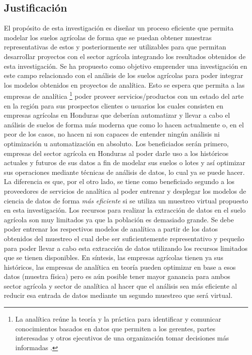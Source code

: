 %
%

\subsection{Justificación}

El propósito de esta investigación es diseñar un proceso eficiente que permita modelar los suelos agrícolas de forma que se puedan obtener muestras representativas de estos y posteriormente ser utilizables para que permitan desarrollar proyectos con el sector agrícola integrando los resultados obtenidos de esta investigación. Se ha propuesto como objetivo emprender una investigación en este campo relacionado con el análisis de los suelos agrícolas para poder integrar los modelos obtenidos en proyectos de analítica. Esto se espera que permita a las empresas de analítica \footnote{La analítica reúne la teoría y la práctica para identificar y comunicar conocimientos basados en datos que permiten a los gerentes, partes interesadas y otros ejecutivos de una organización tomar decisiones más informadas \cite{eastwood-data-analyst-2021}.} poder proveer servicios/productos con un estado del arte en la región para sus prospectos clientes o usuarios los cuales consisten en empresas agrícolas en Honduras que deberían automatizar y llevar a cabo el análisis de suelos de forma más moderna que como lo hacen actualmente o, en el peor de los casos, no hacen ni son capaces de entender ningún análisis ni optimización u automatización en absoluto. Los beneficiados serán primero, empresas del sector agrícola en Honduras al poder darle uso a los históricos actuales y futuros de sus datos a fin de modelar sus suelos o lotes y así optimizar sus operaciones mediante técnicas de análisis de datos, lo cual ya se puede hacer. La diferencia es que, por el otro lado, se tiene como beneficiado segundo a los proveedores de servicios de analítica al poder entrenar y desplegar los modelos de ciencia de datos de forma \textit{más eficiente} si se utiliza un muestreo virtual propuesto en esta investigación. Los recursos para realizar la extracción de datos en el suelo agrícola son muy limitados ya que la población es demasiado grande. Se debe poder entrenar los respectivos modelos de analítica a partir de los datos obtenidos del muestreo el cual debe ser suficientemente representativo y pequeño para poder llevar a cabo esta extracción de datos utilizando los recursos limitados que se tienen disponibles. En síntesis, las empresas agrícolas tienen ya sus históricos, las empresas de analítica en teoría pueden optimizar en base a esos datos (muestra física) pero es aún posible tener mayor ganancia para ambos sector agrícola y sector de analítica al hacer que el análisis sea más eficiente al reducir esa entrada de datos mediante un segundo muestreo que será virtual.

